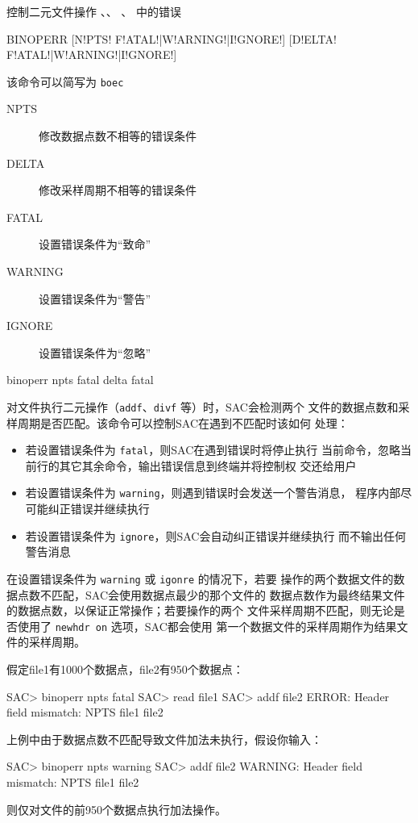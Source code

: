 \label{cmd:binoperr}

控制二元文件操作 、、
、 中的错误

\begin{SACSTX}
BINOPERR [N!PTS! F!ATAL!|W!ARNING!|I!GNORE!] [D!ELTA! F!ATAL!|W!ARNING!|I!GNORE!]
\end{SACSTX}
该命令可以简写为 \texttt{boec}

\begin{description}
\item [NPTS]  修改数据点数不相等的错误条件
\item [DELTA] 修改采样周期不相等的错误条件
\item [FATAL] 设置错误条件为``致命''
\item [WARNING] 设置错误条件为``警告''
\item [IGNORE]  设置错误条件为``忽略''
\end{description}

\begin{SACDFT}
binoperr npts fatal delta fatal
\end{SACDFT}

对文件执行二元操作（\texttt{addf}、\texttt{divf} 等）时，SAC会检测两个
文件的数据点数和采样周期是否匹配。该命令可以控制SAC在遇到不匹配时该如何
处理：
\begin{itemize}
\item 若设置错误条件为 \texttt{fatal}，则SAC在遇到错误时将停止执行
    当前命令，忽略当前行的其它其余命令，输出错误信息到终端并将控制权
    交还给用户
\item 若设置错误条件为 \texttt{warning}，则遇到错误时会发送一个警告消息，
    程序内部尽可能纠正错误并继续执行
\item 若设置错误条件为 \texttt{ignore}，则SAC会自动纠正错误并继续执行
    而不输出任何警告消息
\end{itemize}

在设置错误条件为 \texttt{warning} 或 \texttt{igonre} 的情况下，若要
操作的两个数据文件的数据点数不匹配，SAC会使用数据点最少的那个文件的
数据点数作为最终结果文件的数据点数，以保证正常操作；若要操作的两个
文件采样周期不匹配，则无论是否使用了 \texttt{newhdr on} 选项，SAC都会使用
第一个数据文件的采样周期作为结果文件的采样周期。

假定file1有1000个数据点，file2有950个数据点：
\begin{SACCode}
SAC> binoperr npts fatal
SAC> read file1
SAC> addf file2
ERROR:  Header field mismatch: NPTS file1 file2
\end{SACCode}

上例中由于数据点数不匹配导致文件加法未执行，假设你输入：
\begin{SACCode}
SAC> binoperr npts warning
SAC> addf file2
WARNING:  Header field mismatch: NPTS file1 file2
\end{SACCode}
则仅对文件的前950个数据点执行加法操作。
